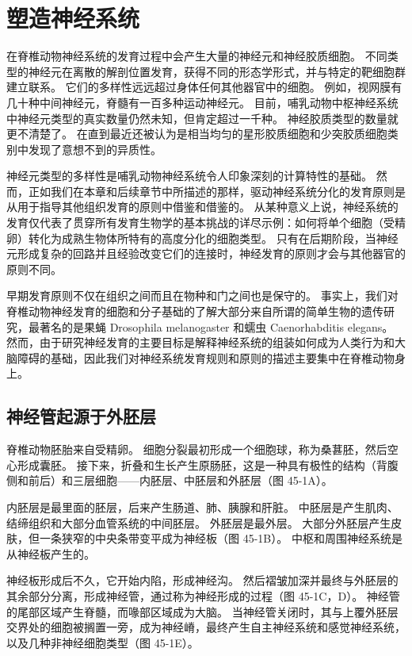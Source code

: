 \chapter{塑造神经系统}
在脊椎动物神经系统的发育过程中会产生大量的神经元和神经胶质细胞。 不同类型的神经元在离散的解剖位置发育，获得不同的形态学形式，并与特定的靶细胞群建立联系。 它们的多样性远远超过身体任何其他器官中的细胞。 例如，视网膜有几十种中间神经元，脊髓有一百多种运动神经元。 目前，哺乳动物中枢神经系统中神经元类型的真实数量仍然未知，但肯定超过一千种。 神经胶质类型的数量就更不清楚了。 在直到最近还被认为是相当均匀的星形胶质细胞和少突胶质细胞类别中发现了意想不到的异质性。

神经元类型的多样性是哺乳动物神经系统令人印象深刻的计算特性的基础。 然而，正如我们在本章和后续章节中所描述的那样，驱动神经系统分化的发育原则是从用于指导其他组织发育的原则中借鉴和借鉴的。 从某种意义上说，神经系统的发育仅代表了贯穿所有发育生物学的基本挑战的详尽示例：如何将单个细胞（受精卵）转化为成熟生物体所特有的高度分化的细胞类型。 只有在后期阶段，当神经元形成复杂的回路并且经验改变它们的连接时，神经发育的原则才会与其他器官的原则不同。

早期发育原则不仅在组织之间而且在物种和门之间也是保守的。 事实上，我们对脊椎动物神经发育的细胞和分子基础的了解大部分来自所谓的简单生物的遗传研究，最著名的是果蝇 Drosophila melanogaster 和蠕虫 Caenorhabditis elegans。 然而，由于研究神经发育的主要目标是解释神经系统的组装如何成为人类行为和大脑障碍的基础，因此我们对神经系统发育规则和原则的描述主要集中在脊椎动物身上。

\section{神经管起源于外胚层}

脊椎动物胚胎来自受精卵。 细胞分裂最初形成一个细胞球，称为桑葚胚，然后空心形成囊胚。 接下来，折叠和生长产生原肠胚，这是一种具有极性的结构（背腹侧和前后）和三层细胞——内胚层、中胚层和外胚层（图 45-1A）。

内胚层是最里面的胚层，后来产生肠道、肺、胰腺和肝脏。 中胚层是产生肌肉、结缔组织和大部分血管系统的中间胚层。 外胚层是最外层。 大部分外胚层产生皮肤，但一条狭窄的中央条带变平成为神经板（图 45-1B）。 中枢和周围神经系统是从神经板产生的。

神经板形成后不久，它开始内陷，形成神经沟。 然后褶皱加深并最终与外胚层的其余部分分离，形成神经管，通过称为神经形成的过程（图 45-1C，D）。 神经管的尾部区域产生脊髓，而喙部区域成为大脑。 当神经管关闭时，其与上覆外胚层交界处的细胞被搁置一旁，成为神经嵴，最终产生自主神经系统和感觉神经系统，以及几种非神经细胞类型（图 45-1E）。

